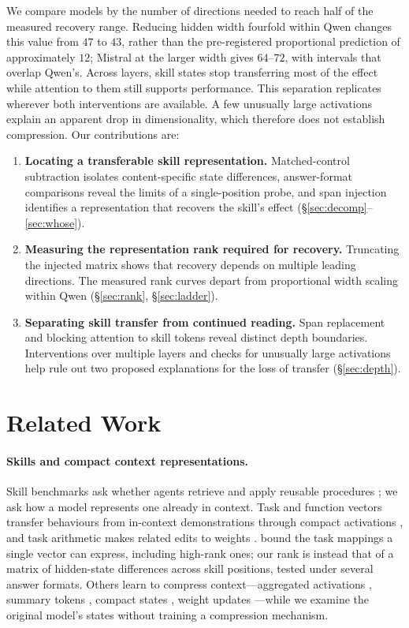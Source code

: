 \documentclass{article}
\begin{document}
We compare models by the number of directions needed to reach half of the
measured recovery range. Reducing hidden width fourfold within Qwen changes
this value from $47$ to $43$, rather than the pre-registered proportional
prediction of approximately $12$; Mistral at the larger width gives $64$--$72$,
with intervals that overlap Qwen's.
Across layers, skill states stop transferring most of the effect while
attention to them still supports performance. This separation replicates
wherever both interventions are available. A few unusually large activations
explain an apparent drop in dimensionality, which therefore does not establish
compression. Our contributions are:
\begin{enumerate}\itemsep0pt\parskip0pt
\item \textbf{Locating a transferable skill representation.} Matched-control
subtraction isolates content-specific state differences, answer-format
comparisons reveal the limits of a single-position probe, and span injection
identifies a representation that recovers the skill's effect
(\S\ref{sec:decomp}--\ref{sec:whose}).
\item \textbf{Measuring the representation rank required for recovery.}
Truncating the injected matrix shows that recovery depends on multiple leading
directions. The measured rank curves depart from proportional width scaling
within Qwen (\S\ref{sec:rank}, \S\ref{sec:ladder}).
\item \textbf{Separating skill transfer from continued reading.} Span
replacement and blocking attention to skill tokens reveal distinct depth
boundaries. Interventions over multiple layers and checks for unusually large
activations help rule out two proposed explanations for the loss of transfer
(\S\ref{sec:depth}).
\end{enumerate}

\section{Related Work}
\label{sec:related}

\paragraph{Skills and compact context representations.}
Skill benchmarks ask whether agents retrieve and apply reusable procedures
\citep{su2026srabench, skillsbench2026, sweskills2026}; we ask how a model
represents one already in context. Task and function vectors transfer behaviours
from in-context demonstrations through compact activations
\citep{hendel2023taskvectors, todd2024functionvectors}, and task arithmetic
makes related edits to weights \citep{ilharco2023taskarithmetic}.
\citet{dong2026taskvectorlimits} bound the task mappings a single vector can
express, including high-rank ones; our rank is instead that of a matrix of
hidden-state differences across skill positions, tested under several answer
formats. Others learn to compress context---aggregated activations
\citep{ardoin2026promptcompression}, summary tokens \citep{mu2023gist}, compact
states \citep{ge2024icae}, weight updates \citep{doc2lora2026,
deepcontextdistill2025}---while we examine the original model's states without
training a compression mechanism.
\end{document}
